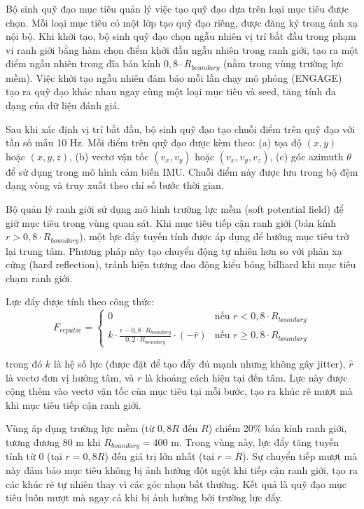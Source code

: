 Bộ sinh quỹ đạo mục tiêu quản lý việc tạo quỹ đạo dựa trên loại mục tiêu được chọn. Mỗi loại mục tiêu có một lớp tạo quỹ đạo riêng, được đăng ký trong ánh xạ nội bộ. Khi khởi tạo, bộ sinh quỹ đạo chọn ngẫu nhiên vị trí bắt đầu trong phạm vi ranh giới bằng hàm chọn điểm khởi đầu ngẫu nhiên trong ranh giới, tạo ra một điểm ngẫu nhiên trong đĩa bán kính $0{,}8 \cdot R_{boundary}$ (nằm trong vùng trường lực mềm). Việc khởi tạo ngẫu nhiên đảm bảo mỗi lần chạy mô phỏng (ENGAGE) tạo ra quỹ đạo khác nhau ngay cùng một loại mục tiêu và seed, tăng tính đa dạng của dữ liệu đánh giá.

Sau khi xác định vị trí bắt đầu, bộ sinh quỹ đạo tạo chuỗi điểm trên quỹ đạo với tần số mẫu 10 Hz. Mỗi điểm trên quỹ đạo được kèm theo: (a) tọa độ $(x, y)$ hoặc $(x, y, z)$, (b) vectơ vận tốc $(v_x, v_y)$ hoặc $(v_x, v_y, v_z)$, (c) góc azimuth $\theta$ để sử dụng trong mô hình cảm biến IMU. Chuỗi điểm này được lưu trong bộ đệm dạng vòng và truy xuất theo chỉ số bước thời gian.

Bộ quản lý ranh giới sử dụng mô hình trường lực mềm (soft potential field) để giữ mục tiêu trong vùng quan sát. Khi mục tiêu tiếp cận ranh giới (bán kính $r > 0{,}8 \cdot R_{boundary}$), một lực đẩy tuyến tính được áp dụng để hướng mục tiêu trở lại trung tâm. Phương pháp này tạo chuyển động tự nhiên hơn so với phản xạ cứng (hard reflection), tránh hiện tượng dao động kiểu bóng billiard khi mục tiêu chạm ranh giới.

Lực đẩy được tính theo công thức:
\begin{equation}
F_{repulse} = \begin{cases}
0 & \text{nếu } r < 0{,}8 \cdot R_{boundary} \\
k \cdot \frac{r - 0{,}8 \cdot R_{boundary}}{0{,}2 \cdot R_{boundary}} \cdot (-\hat{r}) & \text{nếu } r \geq 0{,}8 \cdot R_{boundary}
\end{cases}
\end{equation}

trong đó $k$ là hệ số lực (được đặt để tạo đẩy đủ mạnh nhưng không gây jitter), $\hat{r}$ là vectơ đơn vị hướng tâm, và $r$ là khoảng cách hiện tại đến tâm. Lực này được cộng thêm vào vectơ vận tốc của mục tiêu tại mỗi bước, tạo ra khúc rẽ mượt mà khi mục tiêu tiếp cận ranh giới.

Vùng áp dụng trường lực mềm (từ $0{,}8R$ đến $R$) chiếm 20\% bán kính ranh giới, tương đương 80 m khi $R_{boundary} = 400$ m. Trong vùng này, lực đẩy tăng tuyến tính từ 0 (tại $r = 0{,}8R$) đến giá trị lớn nhất (tại $r = R$). Sự chuyển tiếp mượt mà này đảm bảo mục tiêu không bị ảnh hưởng đột ngột khi tiếp cận ranh giới, tạo ra các khúc rẽ tự nhiên thay vì các góc nhọn bất thường. Kết quả là quỹ đạo mục tiêu luôn mượt mà ngay cả khi bị ảnh hưởng bởi trường lực đẩy.

